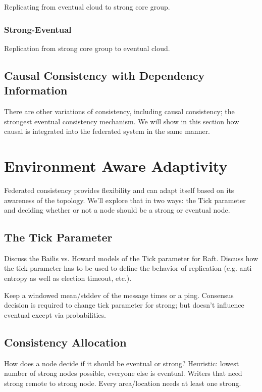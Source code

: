 \documentclass[letterpaper,twocolumn,10pt]{article}
\begin{document}
Replicating from eventual cloud to strong core group.

\subsubsection{Strong-Eventual}

Replication from strong core group to eventual cloud.

\subsection{Causal Consistency with Dependency Information}

There are other variations of consistency, including causal consistency; the strongest eventual consistency mechanism. We will show in this section how causal is integrated into the federated system in the same manner.

\section{Environment Aware Adaptivity}

Federated consistency provides flexibility and can adapt itself based on its awareness of the topology. We'll explore that in two ways: the Tick parameter and deciding whether or not a node should be a strong or eventual node.

\subsection{The Tick Parameter}

Discuss the Bailis vs. Howard models of the Tick parameter for Raft. Discuss how the tick parameter has to be used to define the behavior of replication (e.g. anti-entropy as well as election timeout, etc.).

Keep a windowed mean/stddev of the message times or a ping. Consensus decision is required to change tick parameter for strong; but doesn't influence eventual except via probabilities.

\subsection{Consistency Allocation}

How does a node decide if it should be eventual or strong? Heuristic: lowest number of strong nodes possible, everyone else is eventual. Writers that need strong remote to strong node. Every area/location needs at least one strong.
\end{document}

